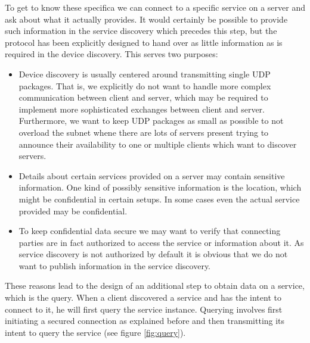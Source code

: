 To get to know these specifica we can connect to a specific service on a server and ask about what it actually provides.
It would certainly be possible to provide such information in the service discovery which precedes this step, but the protocol has been explicitly designed to hand over as little information as is required in the device discovery.
This serves two purposes:
\begin{itemize}
    \item Device discovery is usually centered around transmitting single UDP packages.
        That is, we explicitly do not want to handle more complex communication between client and server, which may be required to implement more sophisticated exchanges between client and server.
        Furthermore, we want to keep UDP packages as small as possible to not overload the subnet whene there are lots of servers present trying to announce their availability to one or multiple clients which want to discover servers.
    \item Details about certain services provided on a server may contain sensitive information.
        One kind of possibly sensitive information is the location, which might be confidential in certain setups.
        In some cases even the actual service provided may be confidential.
    \item To keep confidential data secure we may want to verify that connecting parties are in fact authorized to access the service or information about it.
        As service discovery is not authorized by default it is obvious that we do not want to publish information in the service discovery.
\end{itemize}

These reasons lead to the design of an additional step to obtain data on a service, which is the query.
When a client discovered a service and has the intent to connect to it, he will first query the service instance.
Querying involves first initiating a secured connection as explained before and then transmitting its intent to query the service (see figure \ref{fig:query}).

